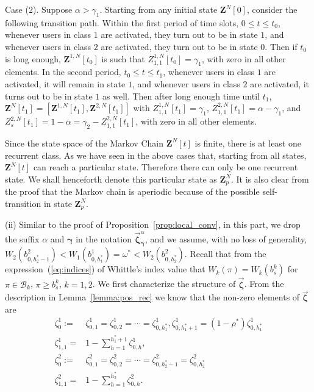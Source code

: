 \documentclass[11pt,twocolumn]{IEEEtran}
\begin{document}
Case (2). Suppose $\alpha>\gamma_1$. Starting from any initial state $\bm Z^N[0]$, consider the following transition path. Within the first period of time slots, $0\leq t \leq t_0$, whenever users in class $1$ are activated, they turn out to be in state $1$, and whenever users in class $2$ are activated, they turn out to be in state $0$. Then if $t_0$ is long enough, $\bm Z^{1,N}[t_0]$ is such that $Z^{1,N}_{1,1}[t_0]=\gamma_1$, with zero in all other elements. In the second period, $t_0\leq t \leq t_1$, whenever users in class $1$ are activated, it will remain in state $1$, and whenever users in class $2$ are activated, it turns out to be in state $1$ as well. Then after long enough time until $t_1$,   $\bm Z^N[t_1]=[\bm Z^{1,N}[t_1], \bm Z^{2,N}[t_1]]$ with $Z^{1,N}_{1,1}[t_1]=\gamma_1$, $Z^{2,N}_{1,1}[t_1]=\alpha-\gamma_1$,  and $Z^{2,N}_{s}[t_1]=1-\alpha=\gamma_2-Z^{2,N}_{1,1}[t_1]$, with zero in all other elements.

Since the state space of the Markov Chain $\bm Z^N[t]$ is finite, there is at least one recurrent class. As we have seen in the above cases that, starting from all states, $\bm Z^N[t]$ can reach a particular state. Therefore there can only be one recurrent state. We shall henceforth denote this particular state as $\bm Z^N_p$. It is also clear from the proof that the Markov chain is aperiodic because of the possible self-transition in state $\bm Z^N_p$.

(ii) Similar to the proof of Proposition~\ref{prop:local_conv}, in this part, we drop the suffix $\alpha$ and $\bm \gamma$ in the notation $\vec{\bm \zeta}^{\alpha}_{\bm \gamma}$, and we assume, with no loss of generality, $W_2(b^2_{0,h^*_2-1})<W_1(b^1_{0,h^*_1})=\omega^*<W_2(b^2_{0,h^*_2})$. Recall that from the expression~(\ref{eq:indices}) of Whittle's index value that $W_k(\pi)=W_k(b^k_s)$ for $\pi \in \mathcal{B}_k$, $\pi\geq b^k_s$, $k=1,2$. We first characterize the structure of $\vec{\bm \zeta}$. From the description in Lemma~\ref{lemma:pos_rec} we know that the non-zero elements of $\vec{\bm \zeta}$ are
\begin{align}
\zeta^1_0:=&\zeta^1_{0,1}=\zeta^1_{0,2}=\cdots=\zeta^1_{0,h_1^*}, \zeta^1_{0,h_1^*{+}1}=(1- \rho^*) \zeta^1_{0,h_1^*}\nonumber\\
\zeta^1_{1,1}=&1-\sum_{h=1}^{h_1^*+1} \zeta^1_{0,h}, \nonumber \\
\zeta^2_0:=&\zeta^2_{0,1}=\zeta^2_{0,2}=\cdots=\zeta^2_{0,h_2^*-1} = \zeta^2_{0,h_2^*}\nonumber\\
\zeta^2_{1,1}=&1-\sum_{h=1}^{h_2^*} \zeta^2_{0,h}. \nonumber
\end{align}
\end{document}
